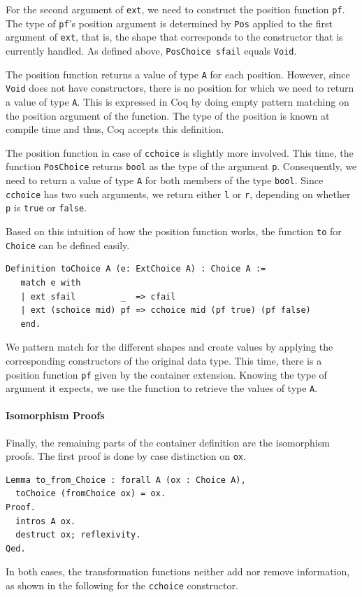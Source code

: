 \documentclass[a4paper, 11pt, fleqn, twoside, abstract=on]{scrreprt}
\newcommand{\cinl}[1]{\texttt{#1}}
\begin{document}
For the second argument of \cinl{ext}, we need to construct the position function \cinl{pf}.
The type of \cinl{pf}'s position argument is determined by \cinl{Pos} applied to the first argument of \cinl{ext}, that is, the shape that corresponds to the constructor that is currently handled.
As defined above, \cinl{PosChoice sfail} equals \cinl{Void}.

The position function returns a value of type \cinl{A} for each position.
However, since \cinl{Void} does not have constructors, there is no position for which we need to return a value of type \cinl{A}. 
This is expressed in Coq by doing empty pattern matching on the position argument of the function.
The type of the position is known at compile time and thus, Coq accepts this definition.

The position function in case of \cinl{cchoice} is slightly more involved.
This time, the function \cinl{PosChoice} returns \cinl{bool} as the type of the argument \cinl{p}.
Consequently, we need to return a value of type \cinl{A} for both members of the type \cinl{bool}.
Since \cinl{cchoice} has two such arguments, we return either \cinl{l} or \cinl{r}, depending on whether \cinl{p} is \cinl{true} or \cinl{false}.

Based on this intuition of how the position function works, the function \cinl{to} for \cinl{Choice} can be defined easily.

\begin{verbatim}
Definition toChoice A (e: ExtChoice A) : Choice A :=
   match e with
   | ext sfail         _  => cfail
   | ext (schoice mid) pf => cchoice mid (pf true) (pf false)
   end.
\end{verbatim}
\noindent
We pattern match for the different shapes and create values by applying the corresponding constructors of the original data type.
This time, there is a position function \cinl{pf} given by the container extension.
Knowing the type of argument it expects, we use the function to retrieve the values of type \cinl{A}.

\paragraph{Isomorphism Proofs}
Finally, the remaining parts of the container definition are the isomorphism proofs.
The first proof is done by case distinction on \cinl{ox}.

\begin{verbatim}
Lemma to_from_Choice : forall A (ox : Choice A),
  toChoice (fromChoice ox) = ox.
Proof.
  intros A ox.
  destruct ox; reflexivity.
Qed.
\end{verbatim}
\noindent
In both cases, the transformation functions neither add nor remove information, as shown in the following for the \cinl{cchoice} constructor.
\end{document}
